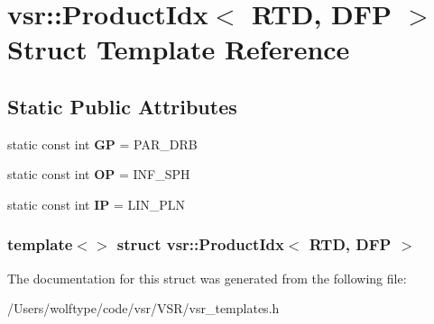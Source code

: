 \hypertarget{structvsr_1_1_product_idx_3_01_r_t_d_00_01_d_f_p_01_4}{\section{vsr\-:\-:Product\-Idx$<$ R\-T\-D, D\-F\-P $>$ Struct Template Reference}
\label{structvsr_1_1_product_idx_3_01_r_t_d_00_01_d_f_p_01_4}
}
\subsection*{Static Public Attributes}
\begin{DoxyCompactItemize}
\item 
\hypertarget{structvsr_1_1_product_idx_3_01_r_t_d_00_01_d_f_p_01_4_ad9901e80d1d0bb3f13da68a862507ef3}{static const int {\bfseries G\-P} = P\-A\-R\-\_\-\-D\-R\-B}\label{structvsr_1_1_product_idx_3_01_r_t_d_00_01_d_f_p_01_4_ad9901e80d1d0bb3f13da68a862507ef3}

\item 
\hypertarget{structvsr_1_1_product_idx_3_01_r_t_d_00_01_d_f_p_01_4_a56c66fbfdafdda37b748bb138a68fa82}{static const int {\bfseries O\-P} = I\-N\-F\-\_\-\-S\-P\-H}\label{structvsr_1_1_product_idx_3_01_r_t_d_00_01_d_f_p_01_4_a56c66fbfdafdda37b748bb138a68fa82}

\item 
\hypertarget{structvsr_1_1_product_idx_3_01_r_t_d_00_01_d_f_p_01_4_a0a2e20f3e00d136ee4ff22239a124072}{static const int {\bfseries I\-P} = L\-I\-N\-\_\-\-P\-L\-N}\label{structvsr_1_1_product_idx_3_01_r_t_d_00_01_d_f_p_01_4_a0a2e20f3e00d136ee4ff22239a124072}

\end{DoxyCompactItemize}
\subsubsection*{template$<$$>$ struct vsr\-::\-Product\-Idx$<$ R\-T\-D, D\-F\-P $>$}



The documentation for this struct was generated from the following file\-:\begin{DoxyCompactItemize}
\item 
/\-Users/wolftype/code/vsr/\-V\-S\-R/vsr\-\_\-templates.\-h\end{DoxyCompactItemize}

